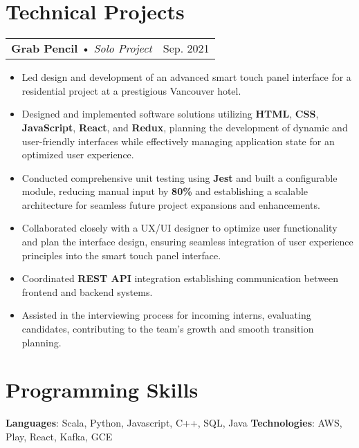 \documentclass[letterpaper,11pt]{article}
\makeatletter
\newcommand{\resumeItemUpdated}[1]{
  \item\small{
    {#1 \vspace{-7pt}}
  }
}
\newcommand{\projectSubheading}[3]{
  \vspace{-1pt}
    \begin{tabular*}{1\textwidth}{l@{\extracolsep{\fill}}r}
      \textbf{#1} • {\textit{#2}} & #3 \\
    \end{tabular*}\vspace{-5pt}
}
\newcommand{\resumeItemListStart}{\begin{itemize}[leftmargin=*]}
\newcommand{\resumeItemListEnd}{\end{itemize}\vspace{-5pt}}
\makeatother
\begin{document}
\section{Technical Projects}
 \projectSubheading
      {Grab Pencil}{Solo Project}{Sep. 2021}
      \resumeItemListStart
        \resumeItemUpdated
          {Led design and development of an advanced smart touch panel interface for a residential project at a prestigious Vancouver hotel.}
        \resumeItemUpdated
          {Designed and implemented software solutions utilizing \textbf{HTML}, \textbf{CSS}, \textbf{JavaScript}, \textbf{React}, and \textbf{Redux}, planning the development of dynamic and user-friendly interfaces while effectively managing application state for an optimized user experience.}
        \resumeItemUpdated
          {Conducted comprehensive unit testing using \textbf{Jest} and built a configurable module, reducing manual input by \textbf{80\%} and establishing a scalable architecture for seamless future project expansions and enhancements.}
        \resumeItemUpdated
          {Collaborated closely with a UX/UI designer to optimize user functionality and plan the interface design, ensuring seamless integration of user experience principles into the smart touch panel interface.}
        \resumeItemUpdated
          {Coordinated \textbf{REST API} integration establishing communication between frontend and backend systems.}
        \resumeItemUpdated
          {Assisted in the interviewing process for incoming interns, evaluating candidates, contributing to the team's growth and smooth transition planning.}
      \resumeItemListEnd

%
\section{Programming Skills}
     \textbf{Languages}{: Scala, Python, Javascript, C++, SQL, Java}
     \hfill
     \textbf{Technologies}{: AWS, Play, React, Kafka, GCE}


\end{document}
